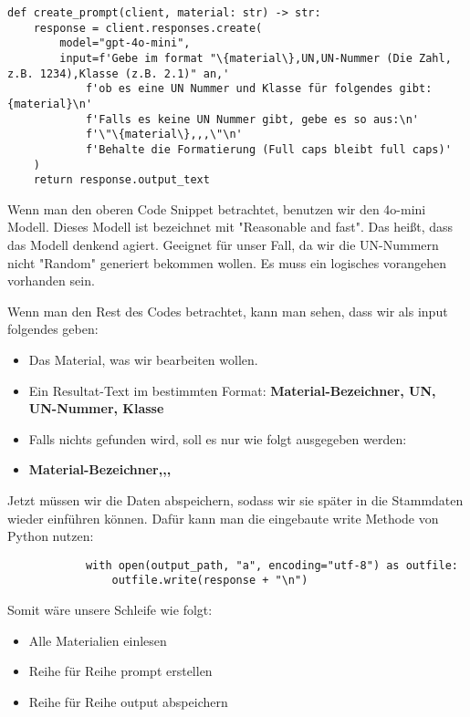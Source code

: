 \begin{lstlisting}
def create_prompt(client, material: str) -> str:
    response = client.responses.create(
        model="gpt-4o-mini",
        input=f'Gebe im format "\{material\},UN,UN-Nummer (Die Zahl, z.B. 1234),Klasse (z.B. 2.1)" an,'
            f'ob es eine UN Nummer und Klasse für folgendes gibt: {material}\n'
            f'Falls es keine UN Nummer gibt, gebe es so aus:\n'
            f'\"\{material\},,,\"\n'
            f'Behalte die Formatierung (Full caps bleibt full caps)'
    )
    return response.output_text
\end{lstlisting}

Wenn man den oberen Code Snippet betrachtet, benutzen wir den 4o-mini Modell.
Dieses Modell ist bezeichnet mit "Reasonable and fast". Das heißt, dass das Modell
denkend agiert. Geeignet für unser Fall, da wir die UN-Nummern
nicht "Random" generiert bekommen wollen. Es muss ein logisches vorangehen vorhanden sein.

Wenn man den Rest des Codes betrachtet, kann man sehen, dass wir als input folgendes geben:
\begin{itemize}
    \item Das Material, was wir bearbeiten wollen.
    \item Ein Resultat-Text im bestimmten Format: \textbf{Material-Bezeichner, UN, UN-Nummer, Klasse}
    \item Falls nichts gefunden wird, soll es nur wie folgt ausgegeben werden:
    \item \textbf{Material-Bezeichner,,,}
\end{itemize}

Jetzt müssen wir die Daten abspeichern, sodass wir sie später in die Stammdaten wieder
einführen können. Dafür kann man die eingebaute write Methode von Python nutzen:

\begin{lstlisting}
            with open(output_path, "a", encoding="utf-8") as outfile:
                outfile.write(response + "\n")
\end{lstlisting}

Somit wäre unsere Schleife wie folgt:

\begin{itemize}
    \item Alle Materialien einlesen
    \item Reihe für Reihe prompt erstellen
    \item Reihe für Reihe output abspeichern
\end{itemize}

